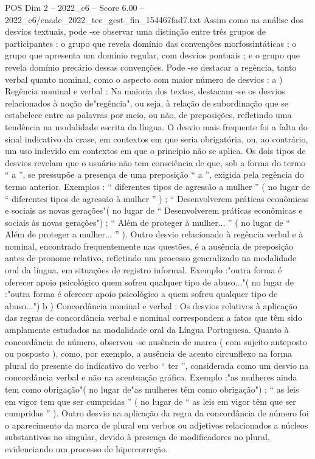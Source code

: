 \begin{textsample}{POS Dim 2 – 2022\_c6 – Score 6.00 – 2022\_c6/enade\_2022\_tec\_gest\_fin\_154467fad7.txt}
Assim como na análise dos desvios textuais, pode -se observar uma distinção entre três grupos de participantes : o grupo que revela domínio das convenções morfossintáticas ; o grupo que apresenta um domínio regular, com desvios pontuais ; e o grupo que revela domínio precário dessas convenções.
Pode -se destacar a regência, tanto verbal quanto nominal, como o aspecto com maior número de desvios : a ) Regência nominal e verbal : Na maioria dos textos, destacam -se os desvios relacionados à noção de"regência", ou seja, à relação de subordinação que se estabelece entre as palavras por meio, ou não, de preposições, refletindo uma tendência na modalidade escrita da língua.
O desvio mais frequente foi a falta do sinal indicativo da crase, em contextos em que seria obrigatória, ou, ao contrário, um uso indevido em contextos em que o princípio não se aplica.
Os dois tipos de desvios revelam que o usuário não tem consciência de que, sob a forma do termo “ a ”, se pressupõe a presença de uma preposição “ a ”, exigida pela regência do termo anterior.
Exemplos : “ diferentes tipos de agressão a mulher ” ( no lugar de “ diferentes tipos de agressão à mulher ” ) ; “ Desenvolverem práticas econômicas e sociais as novas gerações"( no lugar de “ Desenvolverem práticas econômicas e sociais às novas gerações") ; “ Além de proteger à mulher... ” ( no lugar de “ Além de proteger a mulher... ” ).
Outro desvio relacionado à regência verbal e à nominal, encontrado frequentemente nas questões, é a ausência de preposição antes de pronome relativo, refletindo um processo generalizado na modalidade oral da língua, em situações de registro informal.
Exemplo :"outra forma é oferecer apoio psicológico quem sofreu qualquer tipo de abuso..."( no lugar de :"outra forma é oferecer apoio psicológico a quem sofreu qualquer tipo de abuso...") b ) Concordância nominal e verbal : Os desvios relativos à aplicação das regras de concordância verbal e nominal correspondem a fatos que têm sido amplamente estudados na modalidade oral da Língua Portuguesa.
Quanto à concordância de número, observou -se ausência de marca ( com sujeito anteposto ou posposto ), como, por exemplo, a ausência de acento circunflexo na forma plural do presente do indicativo do verbo “ ter ”, considerada como um desvio na concordância verbal e não na acentuação gráfica.
Exemplo :"as mulheres ainda tem como obrigação"( no lugar de"as mulheres têm como obrigação") ; “ as leis em vigor tem que ser cumpridas ” ( no lugar de “ as leis em vigor têm que ser cumpridas ” ).
Outro desvio na aplicação da regra da concordância de número foi o aparecimento da marca de plural em verbos ou adjetivos relacionados a núcleos substantivos no singular, devido à presença de modificadores no plural, evidenciando um processo de hipercorreção.

\end{textsample}
